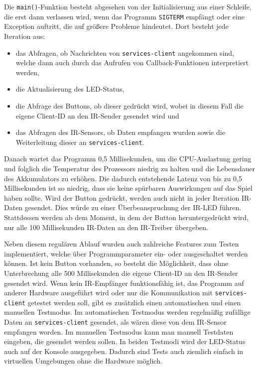 Die \texttt{main()}-Funktion besteht abgesehen von der Initialisierung aus einer Schleife, die erst
dann verlassen wird, wenn das Programm \texttt{SIGTERM} empfängt oder eine Exception auftritt, die
auf größere Probleme hindeutet.
Dort besteht jede Iteration aus:
\begin{itemize}
  \item
    das Abfragen, ob Nachrichten von \texttt{services-client} angekommen sind, welche dann auch
    durch das Aufrufen von Callback-Funktionen interpretiert werden,
  \item
    die Aktualisierung des LED-Status,
  \item
    die Abfrage des Buttons, ob dieser gedrückt wird, wobei in diesem Fall die eigene Client-ID an
    den IR-Sender gesendet wird und
  \item
    das Abfragen des IR-Sensors, ob Daten empfangen wurden sowie die Weiterleitung dieser an
    \texttt{services-client}.
\end{itemize}
Danach wartet das Programm 0,5 Millisekunden, um die CPU-Auslastung gering und folglich die
Temperatur des Prozessors niedrig zu halten und die Lebensdauer des Akkumulators zu erhöhen.
Die dadurch entstehende Latenz von bis zu 0,5 Millisekunden ist so niedrig, dass sie keine spürbaren
Auswirkungen auf das Spiel haben sollte.
Wird der Button gedrückt, werden auch nicht in jeder Iteration IR-Daten gesendet.
Dies würde zu einer Überbeanspruchung der IR-LED führen.
Stattdessen werden ab dem Moment, in dem der Button heruntergedrückt wird, nur alle 100
Millisekunden IR-Daten an den IR-Treiber übergeben.

Neben diesem regulären Ablauf wurden auch zahlreiche Features zum Testen implementiert, welche über
Programmparameter ein- oder ausgeschaltet werden können.
Ist kein Button vorhanden, so besteht die Möglichkeit, dass ohne Unterbrechung alle 500
Millisekunden die eigene Client-ID an den IR-Sender gesendet wird.
Wenn kein IR-Empfänger funktionsfähig ist, das Programm auf anderer Hardware ausgeführt wird oder
nur die Kommunikation mit \texttt{services-client} getestet werden soll, gibt es zusätzlich einen
automatischen und einen manuellen Testmodus.
Im automatischen Testmodus werden regelmäßig zufällige Daten an \texttt{services-client} gesendet,
als wären diese von dem IR-Sensor empfangen worden.
Im manuellen Testmodus kann man manuell Testdaten eingeben, die gesendet werden sollen.
In beiden Testmodi wird der LED-Status auch auf der Konsole ausgegeben.
Dadurch sind Tests auch ziemlich einfach in virtuellen Umgebungen ohne die Hardware möglich.

